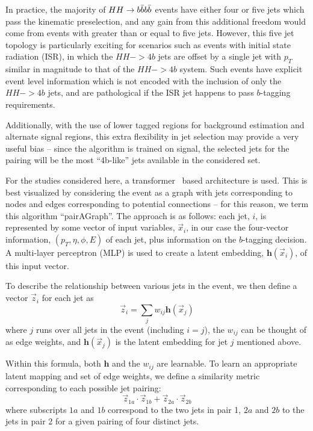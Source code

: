 In practice, the majority of $HH\rightarrow b\bar{b}b\bar{b}$ events have either four or five jets which pass 
the kinematic preselection, and any gain from this additional freedom would come from events with 
greater than or equal to five jets. However, this five jet topology is particularly exciting 
for scenarios such as events with initial state radiation (ISR), in which the $HH->4b$ jets are offset by 
a single jet with $p_{T}$ similar in magnitude to that of the $HH->4b$ system. Such events have explicit 
event level information which is not encoded with the inclusion of only the $HH->4b$ jets, and are 
pathological if the ISR jet happens to pass $b$-tagging requirements.

Additionally, with the use of lower tagged regions for background estimation and alternate 
signal regions, this extra flexibility in jet selection may provide a very useful bias -- 
since the algorithm is trained on signal, the selected jets for the pairing will be the 
most ``4b-like'' jets available in the considered set.

For the studies considered here, a transformer~\cite{Transformers} based architecture is used. This is 
best visualized by considering the event as a graph with jets corresponding to nodes and 
edges corresponding to potential connections -- for this reason, we term this algorithm ``pairAGraph''.
The approach is as follows: each jet, $i$, is represented by some vector of input variables, 
$\vec{x}_i$, in our case the four-vector information, $(p_{T}, \eta, \phi, E)$ of each jet, plus 
information on the $b$-tagging decision. A multi-layer perceptron (MLP) is used to create a latent 
embedding, $\mathbf{h}(\vec{x}_i)$, of this input vector.

To describe the relationship between various jets in the event, we then define a vector $\vec{z}_{i}$ 
for each jet as 
\begin{equation}
\vec{z}_i = \sum\limits_j w_{ij}\mathbf{h}(\vec{x}_j)
\end{equation}
where $j$ runs over all jets in the event (including $i=j$), the $w_{ij}$ can be thought of as 
edge weights, and $\mathbf{h}(\vec{x}_j)$ is the latent embedding for jet $j$ mentioned above.

Within this formula, both $\mathbf{h}$ and the $w_{ij}$ are learnable. To learn an appropriate 
latent mapping and set of edge weights, we define a similarity metric corresponding to each 
possible jet pairing:
\begin{equation}
\vec{z}_{1a}\cdot \vec{z}_{1b} + \vec{z}_{2a}\cdot \vec{z}_{2b}
\end{equation}
where subscripts $1a$ and $1b$ correspond to the two jets in pair 1, $2a$ and $2b$ to 
the jets in pair 2 for a given pairing of four distinct jets.

